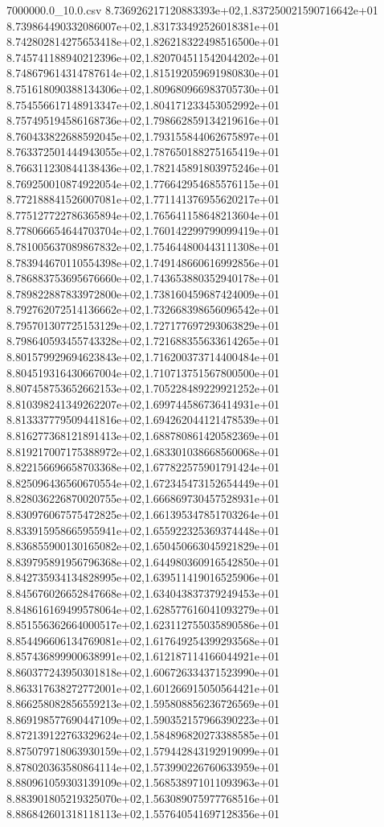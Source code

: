 \begin{filecontents*}{7000000.0_10.0.csv}
8.736926217120883393e+02,1.837250021590716642e+01
8.739864490332086007e+02,1.831733492526018381e+01
8.742802814275653418e+02,1.826218322498516500e+01
8.745741188940212396e+02,1.820704511542044202e+01
8.748679614314787614e+02,1.815192059691980830e+01
8.751618090388134306e+02,1.809680966983705730e+01
8.754556617148913347e+02,1.804171233453052992e+01
8.757495194586168736e+02,1.798662859134219616e+01
8.760433822688592045e+02,1.793155844062675897e+01
8.763372501444943055e+02,1.787650188275165419e+01
8.766311230844138436e+02,1.782145891803975246e+01
8.769250010874922054e+02,1.776642954685576115e+01
8.772188841526007081e+02,1.771141376955620217e+01
8.775127722786365894e+02,1.765641158648213604e+01
8.778066654644703704e+02,1.760142299799099419e+01
8.781005637089867832e+02,1.754644800443111308e+01
8.783944670110554398e+02,1.749148660616992856e+01
8.786883753695676660e+02,1.743653880352940178e+01
8.789822887833972800e+02,1.738160459687424009e+01
8.792762072514136662e+02,1.732668398656096542e+01
8.795701307725153129e+02,1.727177697293063829e+01
8.798640593455743328e+02,1.721688355633614265e+01
8.801579929694623843e+02,1.716200373714400484e+01
8.804519316430667004e+02,1.710713751567800500e+01
8.807458753652662153e+02,1.705228489229921252e+01
8.810398241349262207e+02,1.699744586736414931e+01
8.813337779509441816e+02,1.694262044121478539e+01
8.816277368121891413e+02,1.688780861420582369e+01
8.819217007175388972e+02,1.683301038668560068e+01
8.822156696658703368e+02,1.677822575901791424e+01
8.825096436560670554e+02,1.672345473152654449e+01
8.828036226870020755e+02,1.666869730457528931e+01
8.830976067575472825e+02,1.661395347851703264e+01
8.833915958665955941e+02,1.655922325369374448e+01
8.836855900130165082e+02,1.650450663045921829e+01
8.839795891956796368e+02,1.644980360916542850e+01
8.842735934134828995e+02,1.639511419016525906e+01
8.845676026652847668e+02,1.634043837379249453e+01
8.848616169499578064e+02,1.628577616041093279e+01
8.851556362664000517e+02,1.623112755035890586e+01
8.854496606134769081e+02,1.617649254399293568e+01
8.857436899900638991e+02,1.612187114166044921e+01
8.860377243950301818e+02,1.606726334371523990e+01
8.863317638272772001e+02,1.601266915050564421e+01
8.866258082856559213e+02,1.595808856236726569e+01
8.869198577690447109e+02,1.590352157966390223e+01
8.872139122763329624e+02,1.584896820273388585e+01
8.875079718063930159e+02,1.579442843192919099e+01
8.878020363580864114e+02,1.573990226760633959e+01
8.880961059303139109e+02,1.568538971011093963e+01
8.883901805219325070e+02,1.563089075977768516e+01
8.886842601318118113e+02,1.557640541697128356e+01

\end{filecontents*}
